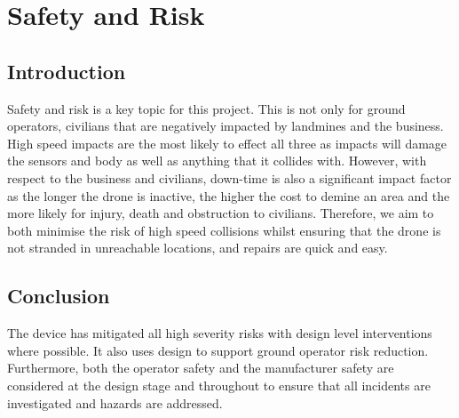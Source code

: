 \section{Safety and Risk}\label{Safety and Risk}
\subsection{Introduction}\label{sub_section:tgt_safety_intro}
Safety and risk is a key topic for this project. This is not only for ground operators, civilians that are negatively impacted by landmines and the business. High speed impacts are the most likely to effect all three as impacts will damage the sensors and body as well as anything that it collides with. However, with respect to the business and civilians, down-time is also a significant impact factor as the longer the drone is inactive, the higher the cost to demine an area and the more likely for injury, death and obstruction to civilians. Therefore, we aim to both minimise the risk of high speed collisions whilst ensuring that the drone is not stranded in unreachable locations, and repairs are quick and easy.




\subsection{Conclusion}
The device has mitigated all high severity risks with design level interventions where possible. It also uses design to support ground operator risk reduction. Furthermore, both the operator safety and the manufacturer safety are considered at the design stage and throughout to ensure that all incidents are investigated and hazards are addressed.